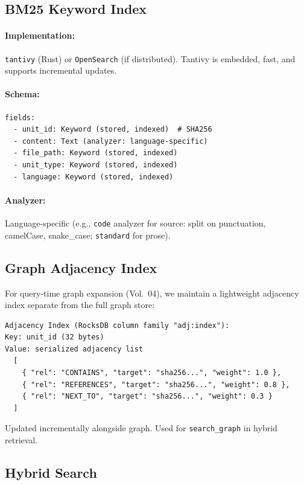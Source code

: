 \subsection{BM25 Keyword Index}
\label{sec:kg:bm25}

\paragraph{Implementation:} \texttt{tantivy} (Rust) or \texttt{OpenSearch} (if distributed). Tantivy is embedded, fast, and supports incremental updates.

\paragraph{Schema:}
\begin{verbatim}
fields:
  - unit_id: Keyword (stored, indexed)  # SHA256
  - content: Text (analyzer: language-specific)
  - file_path: Keyword (stored, indexed)
  - unit_type: Keyword (stored, indexed)
  - language: Keyword (stored, indexed)
\end{verbatim}

\paragraph{Analyzer:} Language-specific (e.g., \texttt{code} analyzer for source: split on punctuation, camelCase, snake\_case; \texttt{standard} for prose).

\subsection{Graph Adjacency Index}
\label{sec:kg:adjacency-index}

For query-time graph expansion (Vol.~04), we maintain a lightweight adjacency index separate from the full graph store:

\begin{verbatim}
Adjacency Index (RocksDB column family "adj:index"):
Key: unit_id (32 bytes)
Value: serialized adjacency list
  [
    { "rel": "CONTAINS", "target": "sha256...", "weight": 1.0 },
    { "rel": "REFERENCES", "target": "sha256...", "weight": 0.8 },
    { "rel": "NEXT_TO", "target": "sha256...", "weight": 0.3 }
  ]
\end{verbatim}

Updated incrementally alongside graph. Used for \texttt{search\_graph} in hybrid retrieval.

\subsection{Hybrid Search}
\label{sec:kg:hybrid-search}

